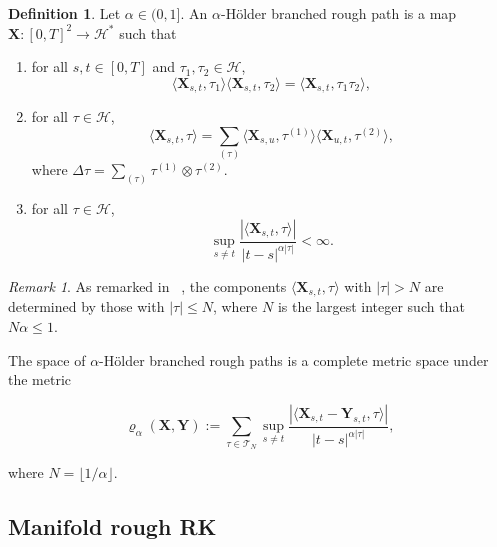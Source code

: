 \documentclass{article}
\theoremstyle{definition}
\newtheorem{definition}{Definition}[section]
\theoremstyle{remark}
\newtheorem*{remark}{Remark}
\begin{document}
\begin{definition}
    Let $\alpha \in (0,1]$. An $\alpha$-H\"older branched rough path is a map $\mathbf{X} : [0,T]^2 \to \mathcal{H}^*$ such that
    \begin{enumerate}
        \item for all $s,t \in [0,T]$ and $\tau_1, \tau_2 \in \mathcal{H}$,
        \begin{equation*}
            \langle \mathbf{X}_{s,t}, \tau_1 \rangle \langle \mathbf{X}_{s,t}, \tau_2 \rangle = \langle \mathbf{X}_{s,t}, \tau_1 \tau_2 \rangle,
        \end{equation*}
        \item for all $\tau \in \mathcal{H}$,
        \begin{equation*}
            \langle \mathbf{X}_{s,t}, \tau \rangle = \sum_{(\tau)} \langle \mathbf{X}_{s,u}, \tau^{(1)} \rangle \langle \mathbf{X}_{u, t}, \tau^{(2)} \rangle,
        \end{equation*}
        where $\Delta \tau = \sum_{(\tau)} \tau^{(1)} \otimes \tau^{(2)}$.
        \item for all $\tau \in \mathcal{H}$,
        \begin{equation*}
            \sup_{s \neq t} \frac{|\langle \mathbf{X}_{s,t}, \tau \rangle |}{|t - s| ^{\alpha |\tau|}} < \infty.
        \end{equation*}
    \end{enumerate}
\end{definition}

\begin{remark}
    As remarked in ~\citep{hairer2015geometric,gubinelli2010ramification}, the components $\langle \mathbf{X}_{s,t}, \tau \rangle$ with $|\tau| > N$ are determined by those with $|\tau| \leq N$, where $N$ is the largest integer such that $N \alpha \leq 1$.
\end{remark}

The space of $\alpha$-H\"older branched rough paths is a complete metric space under the metric

\begin{equation*}
    \varrho_\alpha(\mathbf{X}, \mathbf{Y}) := \sum_{\tau \in \mathcal{T}_N} \sup_{s \neq t} \frac{|\langle \mathbf{X}_{s,t} - \mathbf{Y}_{s,t}, \tau \rangle |}{|t - s|^{\alpha |\tau|}},
\end{equation*}

where $N = \lfloor 1 / \alpha \rfloor$.

\subsection{Manifold rough RK}
\end{document}

